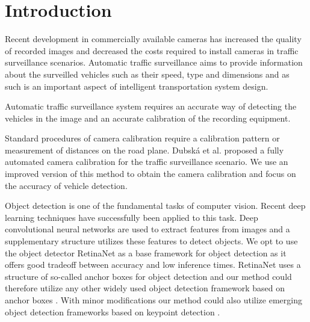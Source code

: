 \documentclass[twocolumn]{svjour3}          \smartqed  \usepackage{graphicx}
\begin{document}
\section{Introduction}
Recent development in commercially available cameras has increased the quality of recorded images and decreased the costs required to install cameras in traffic surveillance scenarios. Automatic traffic surveillance aims to provide information about the surveilled vehicles such as their speed, type and dimensions and as such is an important aspect of intelligent transportation system design.

Automatic traffic surveillance system requires an accurate way of detecting the vehicles in the image and an accurate calibration of the recording equipment. 

Standard procedures of camera calibration require a calibration pattern or measurement of distances on the road plane. Dubsk\'{a} et al. \cite{dubska2014} proposed a fully automated camera calibration for the traffic surveillance scenario. We use an improved version \cite{sochor2017} of this method to obtain the camera calibration and focus on the accuracy of vehicle detection.

Object detection is one of the fundamental tasks of computer vision. Recent deep learning techniques have successfully been applied to this task. Deep convolutional neural networks are used to extract features from images and a supplementary structure utilizes these features to detect objects. We opt to use the object detector RetinaNet \cite{RetinaNet} as a base framework for object detection as it offers good tradeoff between accuracy and low inference times. RetinaNet uses a structure of so-called anchor boxes for object detection and our method could therefore utilize any other widely used object detection framework based on anchor boxes \cite{SSD,redmon,FasterRCNN}. With minor modifications our method could also utilize emerging object detection frameworks based on keypoint detection \cite{CornerNet,ObjectsAsPoints}.
\end{document}
